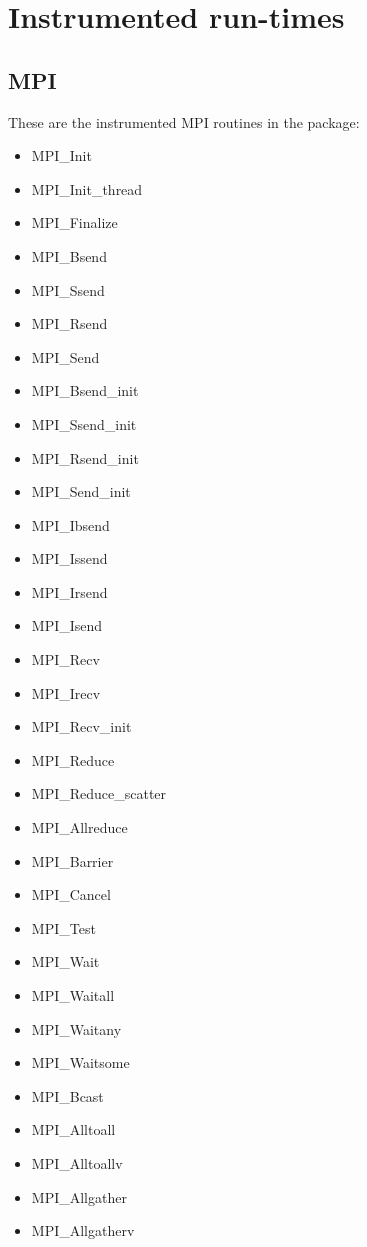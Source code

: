 \chapter{Instrumented run-times}\label{cha:InstrumentedRoutines}

\section{MPI}\label{sec:MPIinstrumentedroutines}

These are the instrumented MPI routines in the \TRACE package:

\begin{itemize}
\item MPI\_Init
\item MPI\_Init\_thread\footnotemark[1]
\item MPI\_Finalize
\item MPI\_Bsend
\item MPI\_Ssend
\item MPI\_Rsend
\item MPI\_Send
\item MPI\_Bsend\_init
\item MPI\_Ssend\_init
\item MPI\_Rsend\_init
\item MPI\_Send\_init
\item MPI\_Ibsend
\item MPI\_Issend
\item MPI\_Irsend
\item MPI\_Isend
\item MPI\_Recv
\item MPI\_Irecv
\item MPI\_Recv\_init
\item MPI\_Reduce
\item MPI\_Reduce\_scatter
\item MPI\_Allreduce
\item MPI\_Barrier
\item MPI\_Cancel
\item MPI\_Test
\item MPI\_Wait
\item MPI\_Waitall
\item MPI\_Waitany
\item MPI\_Waitsome
\item MPI\_Bcast
\item MPI\_Alltoall
\item MPI\_Alltoallv
\item MPI\_Allgather
\item MPI\_Allgatherv

\end{itemize}
